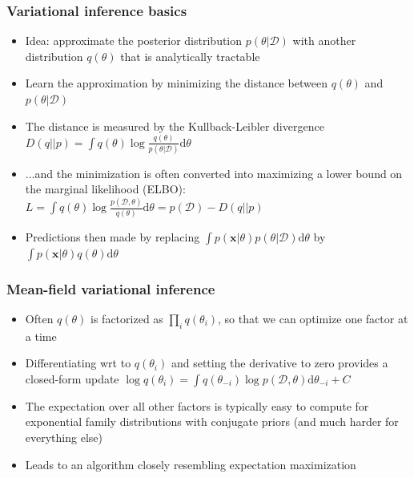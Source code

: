 \documentclass{beamer}
\newcommand{\dataset}{\mathcal{D}}
\newcommand{\parameters}{\theta}
\newcommand{\vx}{\mathbf{x}}
\newcommand{\diff}{\mathrm{d}}
\begin{document}
\begin{frame}
  \frametitle{Variational inference basics}

  \begin{itemize}
  \item Idea: approximate the posterior distribution $p(\parameters | \dataset)$
    with another distribution $q(\parameters)$ that is analytically tractable
  \item Learn the approximation by minimizing the distance between $q(\parameters)$ and $p(\parameters | \dataset)$
  \item The distance is measured by the Kullback-Leibler divergence
    $D(q||p) = \int q(\parameters) \log \frac{q(\parameters)}{p(\parameters| \dataset)}\diff \parameters$
  \item ...and the minimization is often converted into maximizing a lower bound on the marginal
    likelihood (ELBO):
    $L = \int q(\parameters) \log \frac{p(\dataset,\parameters)}{q(\parameters)} \diff \parameters= p(\dataset) - D(q||p)$
  \item Predictions then made by replacing $\int p(\vx|\parameters) p(\parameters | \dataset) \diff \parameters$ by
    $\int p(\vx|\parameters) q(\parameters) \diff \parameters$
  \end{itemize}
\end{frame}

\begin{frame}
  \frametitle{Mean-field variational inference}

  \begin{itemize}
    \item Often $q(\parameters)$ is factorized as $\prod_i q(\parameters_i)$, so that
      we can optimize one factor at a time
    \item Differentiating wrt to $q(\parameters_i)$ and setting the derivative to zero provides a closed-form
      update $\log q(\parameters_i) = \int q(\parameters_{-i}) \log p(\dataset, \parameters) \diff \parameters_{-i} + C$
    \item The expectation over all other factors is typically easy to compute for exponential
      family distributions with conjugate priors (and much harder for everything else)
    \item Leads to an algorithm closely resembling expectation maximization
  \end{itemize}
\end{frame}
\end{document}
